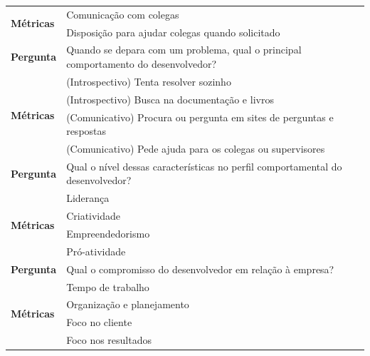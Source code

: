 \begin{table}[h]
\begin{tabular}{|p{2cm}|p{6.25cm}|p{6.25cm}|}
		\multirow{2}{*}{\textbf{Métricas}} & \multicolumn{2}{l|}{Comunicação com colegas}                                                            \\ \cline{2-3} 
		& \multicolumn{2}{l|}{Disposição para ajudar colegas quando solicitado}                                   \\ \hline\hline
		\textbf{Pergunta}                  & \multicolumn{2}{l|}{\parbox[c][1.2cm][c]{12cm}{Quando se depara com um problema, qual o principal comportamento do desenvolvedor?}} \\ \hline
		\multirow{4}{*}{\textbf{Métricas}} & \multicolumn{2}{l|}{(Introspectivo) Tenta resolver sozinho}                                             \\ \cline{2-3} 
		& \multicolumn{2}{l|}{(Introspectivo) Busca na documentação e livros}                                     \\ \cline{2-3} 
		& \multicolumn{2}{l|}{(Comunicativo) Procura ou pergunta em sites de perguntas e respostas}               \\ \cline{2-3} 
		& \multicolumn{2}{l|}{(Comunicativo) Pede ajuda para os colegas ou supervisores}                          \\ \hline\hline
		\textbf{Pergunta}                  & \multicolumn{2}{l|}{\parbox[c][1.2cm][c]{12cm}{Qual o nível dessas características no perfil comportamental do desenvolvedor?}}     \\ \hline
		\multirow{4}{*}{\textbf{Métricas}} & \multicolumn{2}{l|}{Liderança}                                                                          \\ \cline{2-3} 
		& \multicolumn{2}{l|}{Criatividade}                                                                       \\ \cline{2-3} 
		& \multicolumn{2}{l|}{Empreendedorismo}                                                                   \\ \cline{2-3} 
		& \multicolumn{2}{l|}{Pró-atividade}                                                                      \\ \hline\hline
		\textbf{Pergunta}                  & \multicolumn{2}{l|}{\parbox{12cm}{Qual o compromisso do desenvolvedor em relação à empresa?}}                          \\ \hline
		\multirow{4}{*}{\textbf{Métricas}} & \multicolumn{2}{l|}{Tempo de trabalho}                                                                  \\ \cline{2-3} 
		& \multicolumn{2}{l|}{Organização e planejamento}                                                         \\ \cline{2-3} 
		& \multicolumn{2}{l|}{Foco no cliente}                                                                    \\ \cline{2-3} 
		& \multicolumn{2}{l|}{Foco nos resultados}                                                                \\ \hline
	\end{tabular}
\end{table}

